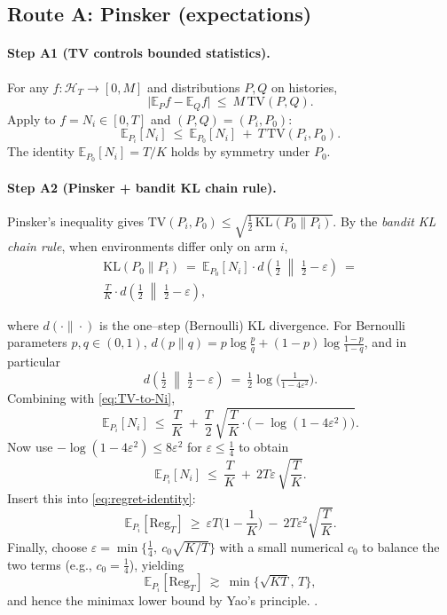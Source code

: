 \documentclass[10pt,twocolumn]{article}
\newcommand{\E}{\mathbb{E}}
\newcommand{\Reg}{\mathrm{Reg}}
\newcommand{\KL}{\mathrm{KL}}
\theoremstyle{definition}
\theoremstyle{remark}
\begin{document}
\subsection{Route A: Pinsker (expectations)}
\label{subsec:routeA}
\paragraph{Step A1 (TV controls bounded statistics).}
For any $f:\mathcal{H}_T\!\to[0,M]$ and distributions $P,Q$ on histories,
\[
  \big|\E_P f-\E_Q f\big|\ \le\ M\,\mathrm{TV}(P,Q).
\]
Apply to $f=N_i\in[0,T]$ and $(P,Q)=(P_i,P_0)$:
\begin{equation}
  \E_{P_i}[N_i]\ \le\ \E_{P_0}[N_i]\ +\ T\,\mathrm{TV}(P_i,P_0).
  \label{eq:TV-to-Ni}
\end{equation}
The identity $\E_{P_0}[N_i]=T/K$ holds by symmetry under $P_0$.

\paragraph{Step A2 (Pinsker + bandit KL chain rule).}
Pinsker’s inequality gives $\mathrm{TV}(P_i,P_0)\le \sqrt{\tfrac12\,\KL(P_0\|P_i)}$.
By the \emph{bandit KL chain rule}, when environments differ only on arm $i$,
\begin{align*}
  \KL(P_0\|P_i) \ =\ \E_{P_0}[N_i]\cdot d\!\left(\tfrac12\;\middle\|\;\tfrac12-\varepsilon\right)\ = \\ \frac{T}{K}\cdot d\!\left(\tfrac12\;\middle\|\;\tfrac12-\varepsilon\right),
\end{align*}

where $d(\cdot\|\cdot)$ is the one–step (Bernoulli) KL divergence. For Bernoulli parameters $p,q\in(0,1)$,
$d(p\|q)=p\log\!\tfrac{p}{q}+(1-p)\log\!\tfrac{1-p}{1-q}$, and in particular
\[
  d\!\left(\tfrac12\;\middle\|\;\tfrac12-\varepsilon\right)\ =\ \tfrac12\log\!\Big(\tfrac{1}{1-4\varepsilon^2}\Big).
\]
Combining with \eqref{eq:TV-to-Ni},
\begin{equation}
  \E_{P_i}[N_i]\ \le\ \frac{T}{K}\ +\ \frac{T}{2}\,\sqrt{\frac{T}{K}\cdot\big(-\log(1-4\varepsilon^2)\big)}.
  \label{eq:Ni-upper}
\end{equation}
Now use $-\log(1-4\varepsilon^2)\le 8\varepsilon^2$ for $\varepsilon\le\tfrac14$ to obtain
\[
  \E_{P_i}[N_i]\ \le\ \frac{T}{K}\ +\ 2T\varepsilon\,\sqrt{\frac{T}{K}}.
\]
Insert this into \eqref{eq:regret-identity}:
\begin{equation}
  \E_{P_i}[\Reg_T]\ \ge\ \varepsilon T\Big(1-\frac{1}{K}\Big)\ -\ 2T\varepsilon^2\sqrt{\frac{T}{K}}.
  \label{eq:regret-lb-eps}
\end{equation}
Finally, choose $\varepsilon = \min\{\tfrac14,\ c_0\sqrt{K/T}\}$ with a small numerical $c_0$ to balance the two terms (e.g., $c_0=\tfrac14$), yielding
\[
  \E_{P_i}[\Reg_T]\ \gtrsim\ \min\{\sqrt{KT},\,T\},
\]
and hence the minimax lower bound by Yao’s principle. \citep[Ch.~2 (Pinsker); Ch.~15 (KL chain rule, lower bound)]{CoverThomas2006,LS20}.
\end{document}
